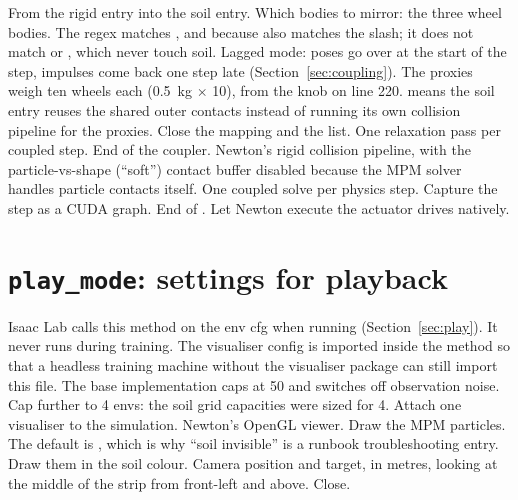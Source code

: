 \begin{explain}
 From the rigid entry into the soil entry.
 Which bodies to mirror: the three wheel bodies. The regex matches
  ,  and
   because  also matches the slash; it
  does not match  or , which never touch soil.
 Lagged mode: poses go over at the start of the step, impulses come
  back one step late (Section~\ref{sec:coupling}).
 The proxies weigh ten wheels each (0.5~kg $\times$ 10), from the
  knob on line 220.
  means the soil entry reuses the shared outer contacts
  instead of running its own collision pipeline for the proxies.
 Close the mapping and the list.
 One relaxation pass per coupled step.
 End of the coupler.
 Newton's rigid collision pipeline, with the particle-vs-shape
  (``soft'') contact buffer disabled because the MPM solver handles particle
  contacts itself.
 One coupled solve per physics step.
 Capture the step as a CUDA graph.
 End of .
 Let Newton execute the actuator drives natively.
\end{explain}

\section{\texttt{play\_mode}: settings for playback}


\begin{explain}
 Isaac Lab calls this method on the env cfg when running
   (Section~\ref{sec:play}). It never runs during training.
 The visualiser config is imported inside the method so that a
  headless training machine without the visualiser package can still import
  this file.
 The base implementation caps  at 50 and switches
  off observation noise.
 Cap further to 4 envs: the soil grid capacities were sized for 4.
 Attach one visualiser to the simulation.
 Newton's OpenGL viewer.
 Draw the MPM particles. The default is , which is why
  ``soil invisible'' is a runbook troubleshooting entry.
 Draw them in the soil colour.
 Camera position and target, in metres, looking at the middle
  of the strip from front-left and above.
 Close.
\end{explain}
